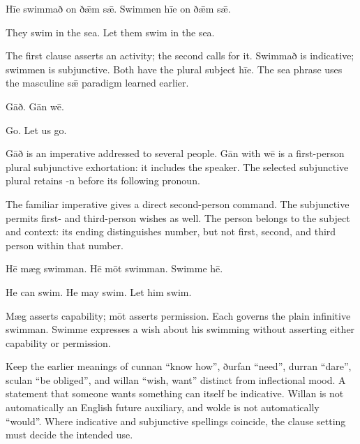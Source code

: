 Hīe swimmað on ðǣm sǣ. Swimmen hīe on ðǣm sǣ.

They swim in the sea. Let them swim in the sea.

The first clause asserts an activity; the second calls for it. Swimmað is indicative; swimmen is subjunctive. Both have the plural subject hīe. The sea phrase uses the masculine sǣ paradigm learned earlier.

Gāð. Gān wē.

Go. Let us go.

Gāð is an imperative addressed to several people. Gān with wē is a first-person plural subjunctive exhortation: it includes the speaker. The selected subjunctive plural retains -n before its following pronoun.

The familiar imperative gives a direct second-person command. The subjunctive permits first- and third-person wishes as well. The person belongs to the subject and context: its ending distinguishes number, but not first, second, and third person within that number.

Hē mæg swimman. Hē mōt swimman. Swimme hē.

He can swim. He may swim. Let him swim.

Mæg asserts capability; mōt asserts permission. Each governs the plain infinitive swimman. Swimme expresses a wish about his swimming without asserting either capability or permission.

Keep the earlier meanings of cunnan “know how”, ðurfan “need”, durran “dare”, sculan “be obliged”, and willan “wish, want” distinct from inflectional mood. A statement that someone wants something can itself be indicative. Willan is not automatically an English future auxiliary, and wolde is not automatically “would”. Where indicative and subjunctive spellings coincide, the clause setting must decide the intended use.

